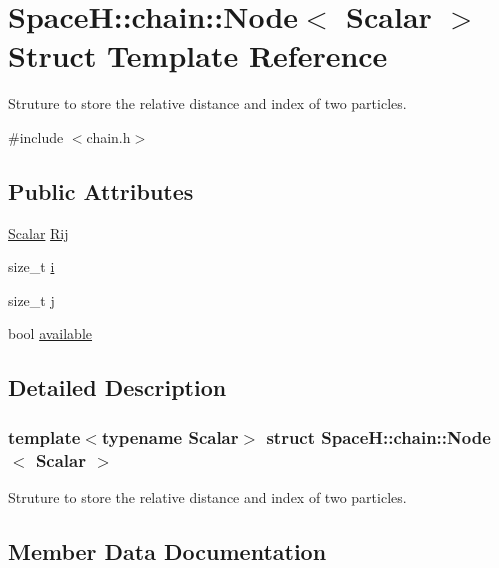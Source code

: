 \hypertarget{struct_space_h_1_1chain_1_1_node}{}\section{SpaceH\+:\+:chain\+:\+:Node$<$ Scalar $>$ Struct Template Reference}
\label{struct_space_h_1_1chain_1_1_node}


Struture to store the relative distance and index of two particles.  




{\ttfamily \#include $<$chain.\+h$>$}

\subsection*{Public Attributes}
\begin{DoxyCompactItemize}
\item 
\mbox{\hyperlink{create_kepler_8cpp_a8c2981f3f834be9448a6ab06c28748eb}{Scalar}} \mbox{\hyperlink{struct_space_h_1_1chain_1_1_node_aea525d23b6c16acd3e2c186d36327f92}{Rij}}
\item 
size\+\_\+t \mbox{\hyperlink{struct_space_h_1_1chain_1_1_node_ac3784f544e43740ba9496a821b1818eb}{i}}
\item 
size\+\_\+t \mbox{\hyperlink{struct_space_h_1_1chain_1_1_node_a7e0bcb5270769de3d49ee981241b027c}{j}}
\item 
bool \mbox{\hyperlink{struct_space_h_1_1chain_1_1_node_a98b17b286eb6c281f087224d348070f6}{available}}
\end{DoxyCompactItemize}


\subsection{Detailed Description}
\subsubsection*{template$<$typename Scalar$>$\newline
struct Space\+H\+::chain\+::\+Node$<$ Scalar $>$}

Struture to store the relative distance and index of two particles. 

\subsection{Member Data Documentation}
\mbox{\label{struct_space_h_1_1chain_1_1_node_a98b17b286eb6c281f087224d348070f6}} 
